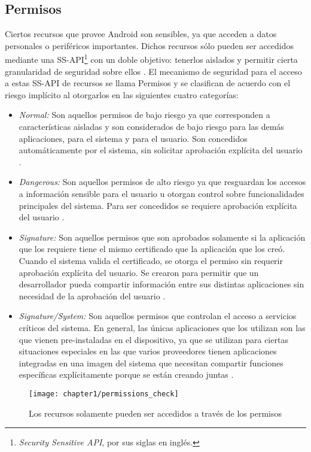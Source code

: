 \subsection{Permisos} \label{ch01-permisos}
Ciertos recursos que provee Android son sensibles, ya que acceden a datos personales o periféricos importantes. Dichos recursos sólo pueden ser accedidos mediante una SS-API\footnote{\textit{Security Sensitive API}, por sus siglas en inglés.} con un doble objetivo: tenerlos aislados y permitir cierta granularidad de seguridad sobre ellos \cite{HYGZD2014}.
El mecanismo de seguridad para el acceso a estas SS-API de recursos se llama Permisos y se clasifican de acuerdo con el riesgo implícito al otorgarlos en las siguientes cuatro categorías:
\begin{itemize}
    \item \emph{Normal:} Son aquellos permisos de bajo riesgo ya que corresponden a características aisladas y son considerados de bajo riesgo para las demás aplicaciones, para el sistema y para el usuario. Son concedidos automáticamente por el sistema, sin solicitar aprobación explícita del usuario \cite{Rom14}.
    \item \emph{Dangerous:} Son aquellos permisos de alto riesgo ya que resguardan los accesos a información sensible para el usuario u otorgan control sobre funcionalidades principales del sistema. Para ser concedidos se requiere aprobación explícita del usuario \cite{Rom14}. 
    \item \emph{Signature:} Son aquellos permisos que son aprobados solamente si la aplicación que los requiere tiene el mismo certificado que la aplicación que los creó. Cuando el sistema valida el certificado, se otorga el permiso sin requerir aprobación explícita del usuario. Se crearon para permitir que un desarrollador pueda compartir información entre sus distintas aplicaciones sin necesidad de la aprobación del usuario \cite{Rom14}.
    \item \emph{Signature/System:} Son aquellos permisos que controlan el acceso a servicios críticos del sistema. En general, las únicas aplicaciones que los utilizan son las que vienen pre-instaladas en el dispositivo, ya que se utilizan para ciertas situaciones especiales en las que varios proveedores tienen aplicaciones integradas en una imagen del sistema que necesitan compartir funciones específicas explícitamente porque se están creando juntas \cite{Rom14}.
\end{itemize}
\begin{figure}[hbtp]
	\begin{center}
		\texttt{[image: chapter1/permissions\_check]}
		\caption{Los recursos solamente pueden ser accedidos a través de los permisos}
		\label{fig:ch01:permissions-check}
	\end{center}
\end{figure}
